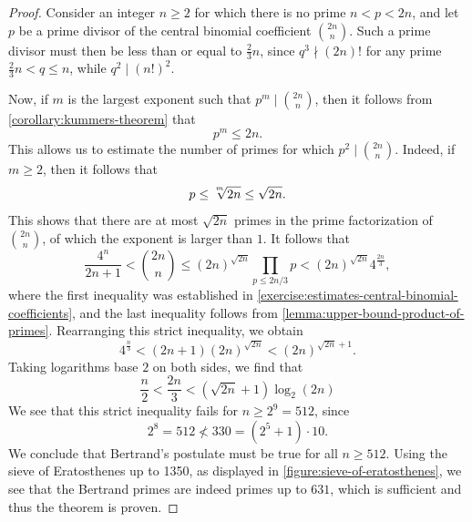 \begin{proof}
  Consider an integer $n\geq 2$ for which there is no prime $n<p<2n$, and let $p$ be a prime divisor of the central binomial coefficient $\binom{2n}{n}$. Such a prime divisor must then be less than or equal to $\frac{2}{3}n$, since $q^3\nmid (2n)!$ for any prime $\frac{2}{3}n<q\leq n$, while $q^2\mid (n!)^2$.

  Now, if $m$ is the largest exponent such that $p^m\mid \binom{2n}{n}$, then it follows from \cref{corollary:kummers-theorem} that
  \begin{equation*}
    p^m\leq 2n.
  \end{equation*}
  This allows us to estimate the number of primes for which $p^2\mid \binom{2n}{n}$. Indeed, if $m\geq 2$, then it follows that
  \begin{equation*}
    p \leq \sqrt[\raisebox{0.3ex}{${\scriptscriptstyle m}$}]{2n}\leq \sqrt{2n}.
  \end{equation*}
  This shows that there are at most $\sqrt{2n}$ primes in the prime factorization of $\binom{2n}{n}$, of which the exponent is larger than $1$. It follows that
  \begin{equation*}
    \frac{4^n}{2n+1}<\binom{2n}{n}\leq (2n)^{\sqrt{2n}}\prod_{p\leq 2n/3}p< (2n)^{\sqrt{2n}} 4^{\frac{2n}{3}},
  \end{equation*}
  where the first inequality was established in \cref{exercise:estimates-central-binomial-coefficients}, and the last inequality follows from \cref{lemma:upper-bound-product-of-primes}. Rearranging this strict inequality, we obtain
  \begin{equation*}
    4^{\frac{n}{3}}<(2n+1)(2n)^{\sqrt{2n}}<(2n)^{\sqrt{2n}+1}.
  \end{equation*}
  Taking logarithms base $2$ on both sides, we find that
  \begin{equation*}
    \frac{n}{2}<\frac{2n}{3} < (\sqrt{2n}+1)\log_2(2n)
  \end{equation*}
  We see that this strict inequality fails for $n\geq 2^9=512$, since
  \begin{equation*}
    2^8 = 512 \nless 330 = (2^5+1)\cdot 10.
  \end{equation*}
  We conclude that Bertrand's postulate must be true for all $n\geq 512$. Using the sieve of Eratosthenes up to 1350, as displayed in \cref{figure:sieve-of-eratosthenes}, we see that the Bertrand primes are indeed primes up to $631$, which is sufficient and thus the theorem is proven.
\end{proof}

